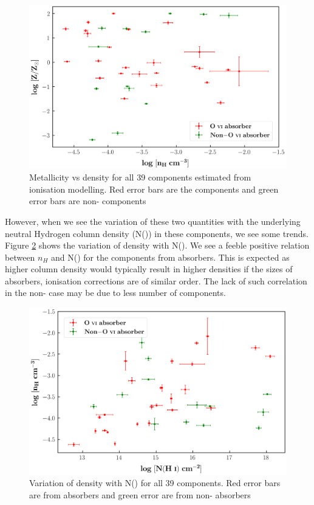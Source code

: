 \begin{figure}
    \centering
    \includegraphics[width=\linewidth]{Figures/Z_vs_nH.png}
    \caption{Metallicity vs density for all 39 components estimated from ionisation modelling. Red error bars are the  components and green error bars are non- components}
    \label{fig:nH-Z}
\end{figure}

However, when we see the variation of these two quantities with the underlying neutral Hydrogen column density (N()) in these components, we see some trends. Figure \ref{fig:nH-NHi} shows the variation of density with N(). We see a feeble positive relation between $n_H$ and N() for the components from  absorbers. This is expected as higher column density would typically result in higher densities if the sizes of absorbers, ionisation corrections are of similar order. The lack of such correlation in the non- case may be due to less number of components.

\begin{figure}
    \centering
    \includegraphics[width=\linewidth]{Figures/nH_vs_NHi.png}
    \caption{Variation of density with N() for all 39 components. Red error bars are from  absorbers and green error are from non- absorbers}
    \label{fig:nH-NHi}
\end{figure}

